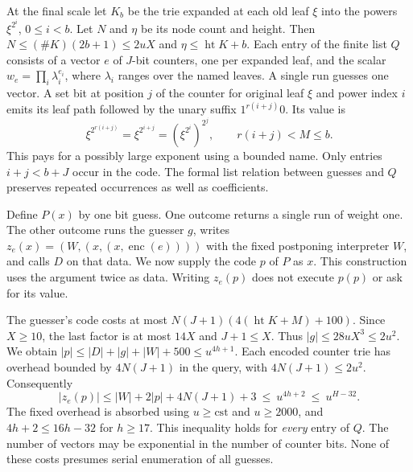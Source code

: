 
\clearpage
{}
At the final scale let $K_b$ be the trie expanded at each old leaf $\xi$ into the powers $\xi^{2^i}$, $0\le i<b$. Let $N$ and $\eta$ be its node count and height. Then $N\le(\#K)(2b+1)\le2uX$ and $\eta\le\operatorname{ht}K+b$. Each entry of the finite list $Q$ consists of a vector $e$ of $J$-bit counters, one per expanded leaf, and the scalar $w_e=\prod_i\lambda_i^{e_i}$, where $\lambda_i$ ranges over the named leaves. A single run guesses one vector. A set bit at position $j$ of the counter for original leaf $\xi$ and power index $i$ emits its leaf path followed by the unary suffix $1^{r(i+j)}0$. Its value is
\[
 \xi^{2^{r(i+j)}}=\xi^{2^{i+j}}=(\xi^{2^i})^{2^j},\qquad r(i+j)<M\le b .
\]
This pays for a possibly large exponent using a bounded name. Only entries $i+j<b+J$ occur in the code. The formal list relation between guesses and $Q$ preserves repeated occurrences as well as coefficients.

Define $P(x)$ by one bit guess. One outcome returns a single run of weight one. The other outcome runs the guesser $g$, writes
$z_e(x)=(W,(x,(x,\operatorname{enc}(e))))$ with the fixed postponing interpreter $W$, and calls $D$ on that data. We now supply the code $p$ of $P$ as $x$. This construction uses the argument twice as data. Writing $z_e(p)$ does not execute $p(p)$ or ask for its value.

The guesser's code costs at most $N(J+1)(4(\operatorname{ht}K+M)+100)$. Since $X\ge10$, the last factor is at most $14X$ and $J+1\le X$. Thus $|g|\le28uX^3\le2u^2$. We obtain $|p|\le|D|+|g|+|W|+500\le u^{4h+1}$. Each encoded counter trie has overhead bounded by $4N(J+1)$ in the query, with $4N(J+1)\le2u^2$. Consequently
\[
 |z_e(p)|\le |W|+2|p|+4N(J+1)+3
 \ \le\ u^{4h+2}\ \le\ u^{H-32}.
\]
The fixed overhead is absorbed using $u\ge\mathrm{cst}$ and $u\ge2000$, and $4h+2\le16h-32$ for $h\ge17$. This inequality holds for \emph{every} entry of $Q$. The number of vectors may be exponential in the number of counter bits. None of these costs presumes serial enumeration of all guesses.


